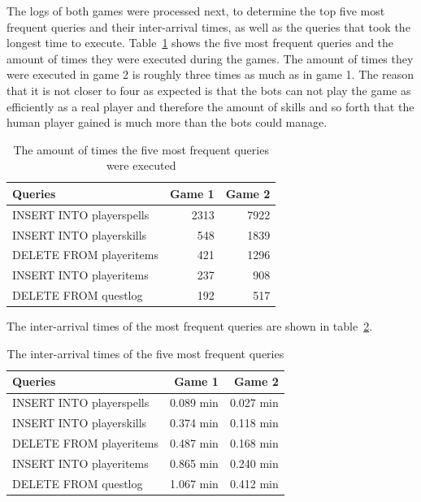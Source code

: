 The logs of both games were processed next, to determine the top five most frequent queries and their inter-arrival times, as well as the queries that took the longest time to execute. Table~\ref{amount} shows the five most frequent queries and the amount of times they were executed during the games. The amount of times they were executed in game 2 is roughly three times as much as in game 1. The reason that it is not closer to four as expected is that the bots can not play the game as efficiently as a real player and therefore the amount of skills and so forth that the human player gained is much more than the bots could manage.

\begin{table}[htbp]
  \centering
  \caption{The amount of times the five most frequent queries were executed}
    \begin{tabular}{lrr}
    \addlinespace
    \toprule
    \textbf{Queries} & \textbf{Game 1} & \textbf{Game 2} \\
    \midrule
    INSERT INTO playerspells & 2313  & 7922 \\
    \midrule
    INSERT INTO playerskills & 548   & 1839 \\
    \midrule
    DELETE FROM playeritems & 421   & 1296 \\
    \midrule
    INSERT INTO playeritems & 237   & 908 \\
    \midrule
    DELETE FROM questlog & 192   & 517 \\
    \bottomrule
    \end{tabular}%
  \label{amount}%
\end{table}%

The inter-arrival times of the most frequent queries are shown in table~\ref{interamount}.

\begin{table}[htbp]
  \centering
  \caption{The inter-arrival times of the five most frequent queries}
    \begin{tabular}{lrr}
    \addlinespace
    \toprule
    \textbf{Queries} & \textbf{Game 1} & \textbf{Game 2} \\
    \midrule
    INSERT INTO playerspells & 0.089 min  & 0.027 min \\
    \midrule
    INSERT INTO playerskills & 0.374 min   & 0.118 min \\
    \midrule
    DELETE FROM playeritems & 0.487 min   & 0.168 min \\
    \midrule
    INSERT INTO playeritems & 0.865 min   & 0.240 min \\
    \midrule
    DELETE FROM questlog & 1.067 min   & 0.412 min \\
    \bottomrule
    \end{tabular}%
  \label{interamount}%
\end{table}%

